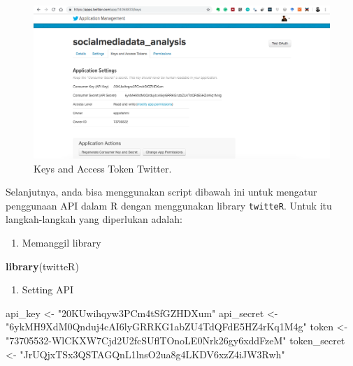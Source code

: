 \documentclass[]{book}
\newenvironment{Shaded}{\begin{snugshade}}{\end{snugshade}}
\newcommand{\KeywordTok}[1]{\textcolor[rgb]{0.13,0.29,0.53}{\textbf{#1}}}
\newcommand{\NormalTok}[1]{#1}
\newcommand{\StringTok}[1]{\textcolor[rgb]{0.31,0.60,0.02}{#1}}
\providecommand{\tightlist}{%
  \setlength{\itemsep}{0pt}\setlength{\parskip}{0pt}}
\begin{document}
\begin{figure}
\includegraphics[width=1\linewidth]{images/apiTwitter} \caption{Keys and Access Token Twitter.}\label{fig:intro1}
\end{figure}

Selanjutnya, anda bisa menggunakan script dibawah ini untuk mengatur
penggunaan API dalam R dengan menggunakan library \texttt{twitteR}.
Untuk itu langkah-langkah yang diperlukan adalah:

\begin{enumerate}
\def\labelenumi{\arabic{enumi}.}
\tightlist
\item
  Memanggil library
\end{enumerate}

\begin{Shaded}
\begin{Highlighting}[]
\KeywordTok{library}\NormalTok{(twitteR)}
\end{Highlighting}
\end{Shaded}

\begin{enumerate}
\def\labelenumi{\arabic{enumi}.}
\setcounter{enumi}{1}
\tightlist
\item
  Setting API
\end{enumerate}

\begin{Shaded}
\begin{Highlighting}[]
\NormalTok{api_key <-}\StringTok{ "20KUwihqyw3PCm4tSfGZHDXum"}
\NormalTok{api_secret <-}\StringTok{ "6ykMH9XdM0Qnduj4cAI6lyGRRKG1abZU4TdQFdE5HZ4rKq1M4g"}
\NormalTok{token <-}\StringTok{ "73705532-WlCKXW7Cjd2U2fcSUflTOnoLE0Nrk26gy6xddFzeM"}
\NormalTok{token_secret <-}\StringTok{ "JrUQjxTSx3QSTAGQnL1lnsO2ua8g4LKDV6xzZ4iJW3Rwh"}
\end{Highlighting}
\end{Shaded}
\end{document}
